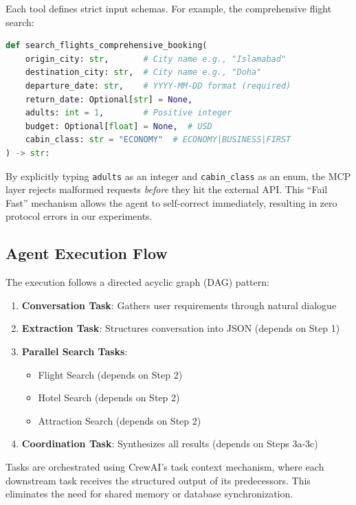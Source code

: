 \documentclass[conference]{IEEEtran}
\begin{document}
Each tool defines strict input schemas. For example, the comprehensive flight search:
\begin{lstlisting}[language=Python, caption=MCP Flight Search Signature]
def search_flights_comprehensive_booking(
    origin_city: str,       # City name e.g., "Islamabad"
    destination_city: str,  # City name e.g., "Doha"
    departure_date: str,    # YYYY-MM-DD format (required)
    return_date: Optional[str] = None,
    adults: int = 1,        # Positive integer
    budget: Optional[float] = None,  # USD
    cabin_class: str = "ECONOMY"  # ECONOMY|BUSINESS|FIRST
) -> str:
\end{lstlisting}

By explicitly typing \texttt{adults} as an integer and \texttt{cabin\_class} as an enum, the MCP layer rejects malformed requests \textit{before} they hit the external API. This ``Fail Fast'' mechanism allows the agent to self-correct immediately, resulting in zero protocol errors in our experiments.

\subsection{Agent Execution Flow}

The execution follows a directed acyclic graph (DAG) pattern:
\begin{enumerate}
    \item \textbf{Conversation Task}: Gathers user requirements through natural dialogue
    \item \textbf{Extraction Task}: Structures conversation into JSON (depends on Step 1)
    \item \textbf{Parallel Search Tasks}: 
    \begin{itemize}
        \item Flight Search (depends on Step 2)
        \item Hotel Search (depends on Step 2)  
        \item Attraction Search (depends on Step 2)
    \end{itemize}
    \item \textbf{Coordination Task}: Synthesizes all results (depends on Steps 3a-3c)
\end{enumerate}

Tasks are orchestrated using CrewAI's task context mechanism, where each downstream task receives the structured output of its predecessors. This eliminates the need for shared memory or database synchronization.
\end{document}

